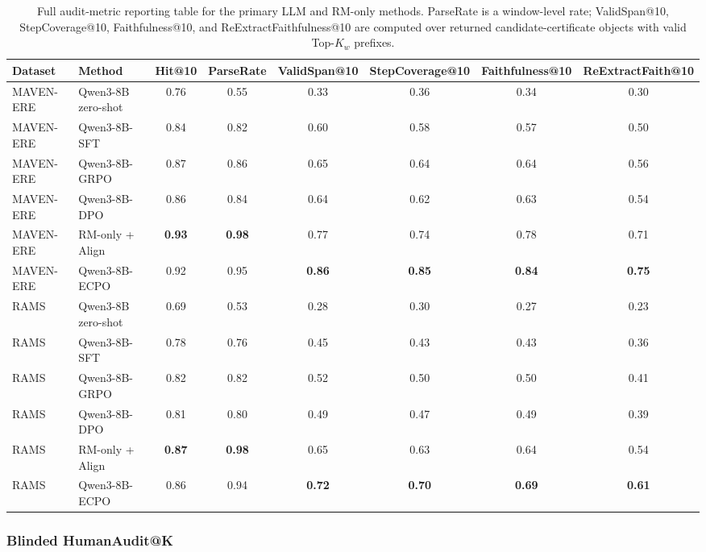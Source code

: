 \documentclass{article}
\newcommand{\ECPO}{\textsc{ECPO}}
\begin{document}
\begin{table}[t]
\centering
\caption{Full audit-metric reporting table for the primary LLM and RM-only methods. ParseRate is a window-level rate; ValidSpan@10, StepCoverage@10, Faithfulness@10, and ReExtractFaithfulness@10 are computed over returned candidate-certificate objects with valid Top-$K_w$ prefixes.}
\label{tab:full_audit_metrics}
\small
\begin{adjustbox}{max width=\textwidth}
\begin{tabular}{l l c c c c c c}
\toprule
Dataset & Method & Hit@10 & ParseRate & ValidSpan@10 & StepCoverage@10 & Faithfulness@10 & ReExtractFaith@10 \\
\midrule
MAVEN-ERE & Qwen3-8B zero-shot & 0.76 & 0.55 & 0.33 & 0.36 & 0.34 & 0.30 \\
MAVEN-ERE & Qwen3-8B-SFT & 0.84 & 0.82 & 0.60 & 0.58 & 0.57 & 0.50 \\
MAVEN-ERE & Qwen3-8B-GRPO & 0.87 & 0.86 & 0.65 & 0.64 & 0.64 & 0.56 \\
MAVEN-ERE & Qwen3-8B-DPO & 0.86 & 0.84 & 0.64 & 0.62 & 0.63 & 0.54 \\
MAVEN-ERE & RM-only + Align & \textbf{0.93} & \textbf{0.98} & 0.77 & 0.74 & 0.78 & 0.71 \\
MAVEN-ERE & Qwen3-8B-\ECPO & 0.92 & 0.95 & \textbf{0.86} & \textbf{0.85} & \textbf{0.84} & \textbf{0.75} \\
\midrule
RAMS & Qwen3-8B zero-shot & 0.69 & 0.53 & 0.28 & 0.30 & 0.27 & 0.23 \\
RAMS & Qwen3-8B-SFT & 0.78 & 0.76 & 0.45 & 0.43 & 0.43 & 0.36 \\
RAMS & Qwen3-8B-GRPO & 0.82 & 0.82 & 0.52 & 0.50 & 0.50 & 0.41 \\
RAMS & Qwen3-8B-DPO & 0.81 & 0.80 & 0.49 & 0.47 & 0.49 & 0.39 \\
RAMS & RM-only + Align & \textbf{0.87} & \textbf{0.98} & 0.65 & 0.63 & 0.64 & 0.54 \\
RAMS & Qwen3-8B-\ECPO & 0.86 & 0.94 & \textbf{0.72} & \textbf{0.70} & \textbf{0.69} & \textbf{0.61} \\
\bottomrule
\end{tabular}
\end{adjustbox}
\end{table}

\subsubsection{Blinded HumanAudit@K}
\label{sec:app_explain_human}
\end{document}

